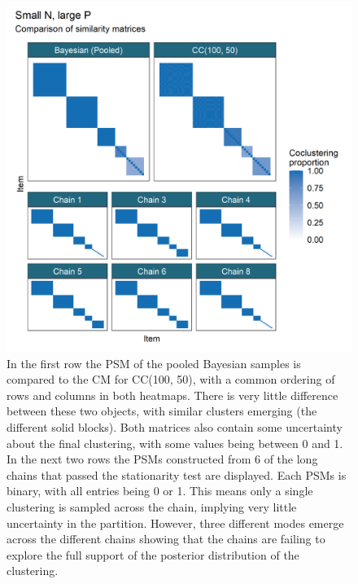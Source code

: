 \documentclass{bioinfo}
\begin{document}
\begin{figure} %
	\centering
	\includegraphics[scale=0.17]{./Images/Simulations/small_n_large_p_base/comp_psms_cm_edited.png}	
	\caption{In the first row the PSM of the pooled Bayesian samples is compared to the CM for CC(100, 50), with a common ordering of rows and columns in both heatmaps. There is very little difference between these two objects, with similar clusters emerging (the different solid blocks). Both matrices also contain some uncertainty about the final clustering, with some values being between 0 and 1. In the next two rows the PSMs constructed from 6 of the long chains that passed the stationarity test are displayed. Each PSMs is binary, with all entries being 0 or 1. This means only a single clustering is sampled across the chain, implying very little uncertainty in the partition. However, three different modes emerge across the different chains showing that the chains are failing to explore the full support of the posterior distribution of the clustering.}
	\label{fig:simSmallNLargePPSMs}
\end{figure}
\end{document}
